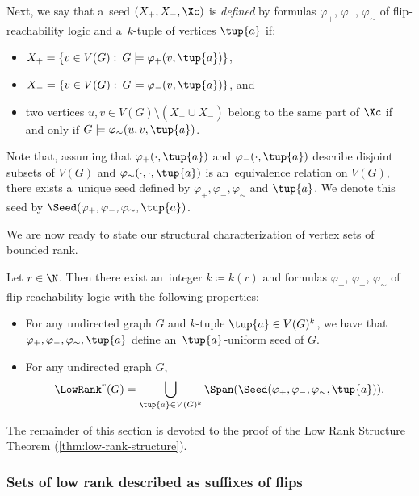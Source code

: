 Next, we say that a~seed $(X_+, X_-, \Xc)$ is \emph{defined} by formulas $\varphi_+$, $\varphi_-$, $\varphi_{\sim}$ of flip-reachability logic and a~$k$-tuple of vertices $\tup{a}$ if:
\begin{itemize}[nosep]
    \item $X_+ = \{v \in V(G) \,\colon\, G \models \varphi_+(v, \tup{a})\}$,
    \item $X_- = \{v \in V(G) \,\colon\, G \models \varphi_-(v, \tup{a})\}$, and
    \item two vertices $u, v \in V(G) \setminus (X_+ \cup X_-)$ belong to the same part of $\Xc$ if and only if $G \models \varphi_\sim(u, v, \tup{a})$.
\end{itemize}
Note that, assuming that $\varphi_+(\cdot, \tup{a})$ and $\varphi_-(\cdot, \tup{a})$ describe disjoint subsets of $V(G)$ and $\varphi_{\sim}(\cdot, \cdot, \tup{a})$ is an~equivalence relation on $V(G)$, there exists a~unique seed defined by $\varphi_+, \varphi_-, \varphi_{\sim}$ and $\tup{a}$.
We denote this seed by $\Seed(\varphi_+, \varphi_-, \varphi_{\sim}, \tup{a})$.

We are now ready to state our structural characterization of vertex sets of bounded rank.
\begin{theorem}
    \label{thm:low-rank-structure}
    Let $r \in \N$.
    Then there exist an~integer $k \coloneqq k(r)$ and formulas $\varphi_+$, $\varphi_-$, $\varphi_{\sim}$ of flip-reachability logic with the following properties:
    \begin{itemize}[nosep]
        \item For any undirected graph $G$ and $k$-tuple $\tup{a} \in V(G)^k$, we have that $\varphi_+, \varphi_-, \varphi_{\sim}, \tup{a}$ define an~$\tup{a}$-uniform seed of $G$.
        \item For any undirected graph $G$,
        \[
            \LowRank^r(G) = \bigcup_{\tup{a} \in V(G)^k} \Span(\Seed(\varphi_+, \varphi_-, \varphi_{\sim}, \tup{a})).
        \]
    \end{itemize}
\end{theorem}

The remainder of this section is devoted to the proof of the Low Rank Structure Theorem (\cref{thm:low-rank-structure}).


\subsubsection{Sets of low rank described as suffixes of flips}

